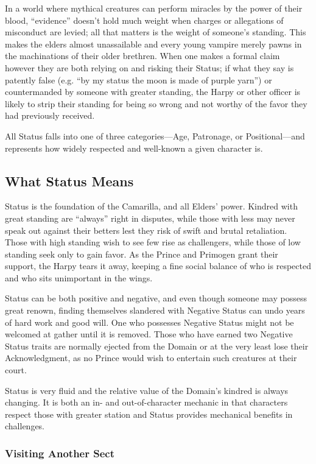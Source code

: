 In a world where mythical creatures can perform miracles by the power of their 
blood, ``evidence'' doesn't hold much weight when charges or allegations of 
misconduct are levied; all that matters is the weight of someone's standing.  This 
makes the elders almost unassailable and every young vampire merely pawns in the 
machinations of their older brethren.  When one makes a formal claim however they 
are both relying on and risking their Status; if what they say is patently false 
(e.g. ``by my status the moon is made of purple yarn'') or countermanded by someone 
with greater standing, the Harpy or other officer is likely to strip their standing 
for being so wrong and not worthy of the favor they had previously received.

All Status falls into one of three categories---Age, Patronage, or Positional---and 
represents how widely respected and well-known a given character is.

\subsection{What Status Means}
Status is the foundation of the Camarilla, and all Elders' power.  Kindred with great 
standing are ``always'' right in disputes, while those with less may never speak out 
against their betters lest they risk of swift and brutal retaliation.  Those with high 
standing wish to see few rise as challengers, while those of low standing seek only 
to gain favor.  As the Prince and Primogen grant their support, the Harpy tears it 
away, keeping a fine social balance of who is respected and who sits unimportant in the 
wings.

Status can be both positive and negative, and even though someone may possess great 
renown, finding themselves slandered with Negative Status can undo years of hard work 
and good will.  One who possesses Negative Status might not be welcomed at gather 
until it is removed.  Those who have earned two Negative Status traits are normally 
ejected from the Domain or at the very least lose their Acknowledgment, as no Prince 
would wish to entertain such creatures at their court.

Status is very fluid and the relative value of the Domain's kindred is always changing.  
It is both an in- and out-of-character mechanic in that characters respect those with 
greater station and Status provides mechanical benefits in challenges.

\subsubsection{Visiting Another Sect}

